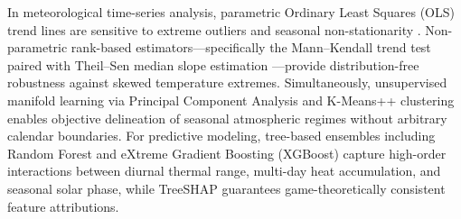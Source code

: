 \documentclass[conference]{IEEEtran}
\begin{document}
In meteorological time-series analysis, parametric Ordinary Least Squares (OLS) trend lines are sensitive to extreme outliers and seasonal non-stationarity \cite{sapkota2007}. Non-parametric rank-based estimators---specifically the Mann--Kendall trend test \cite{mann1945, kendall1975} paired with Theil--Sen median slope estimation \cite{sen1968}---provide distribution-free robustness against skewed temperature extremes. Simultaneously, unsupervised manifold learning via Principal Component Analysis \cite{hotelling1933} and K-Means++ clustering \cite{macqueen1967, rousseeuw1987, davies1979} enables objective delineation of seasonal atmospheric regimes without arbitrary calendar boundaries. For predictive modeling, tree-based ensembles including Random Forest \cite{breiman2001} and eXtreme Gradient Boosting (XGBoost) \cite{chen2016} capture high-order interactions between diurnal thermal range, multi-day heat accumulation, and seasonal solar phase, while TreeSHAP \cite{lundberg2017} guarantees game-theoretically consistent feature attributions.
\end{document}
